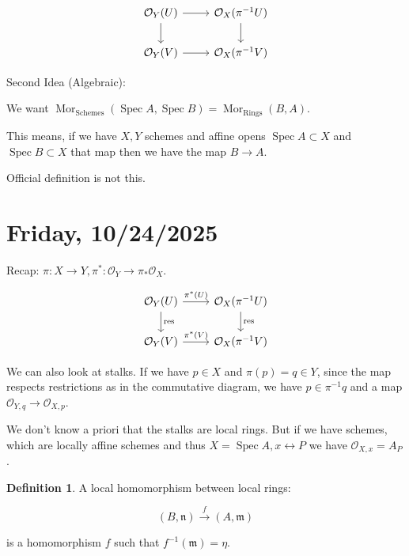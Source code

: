 \documentclass{article}
\theoremstyle{definition}
\newtheorem*{definition}{Definition}
\begin{document}
    \[
        \begin{tikzcd}
            \mathcal{O}_Y(U) \ar[d] \ar[r] & \mathcal{O}_X(\pi ^{-1} U) \ar[d] \\ \mathcal{O}_Y(V) \ar[r] & \mathcal{O}_X(\pi ^{-1} V)
        \end{tikzcd}
    \]

    Second Idea (Algebraic):

    We want \(\operatorname{Mor}_{\text{Schemes}} (\operatorname{Spec} A, \operatorname{Spec} B) = \operatorname{Mor} _{\text{Rings}}(B,A)\).

    This means, if we have \(X, Y\) schemes and affine opens \(\operatorname{Spec} A \subset X\) and \(\operatorname{Spec} B \subset X\) that map then we have the map \(B \to A\).

    Official definition is not this.

    \section*{Friday, 10/24/2025}
    
    Recap: \(\pi: X \to Y, \pi ^{\ast} : \mathcal{O}_Y \to \pi _{\ast} \mathcal{O} _X\).

    \[
        \begin{tikzcd}
            \mathcal{O}_Y(U) \ar[r,"\pi ^{\ast} (U)"] \ar[d,"\text{res}"] & \mathcal{O} _X(\pi ^{-1} U) \ar[d, "\text{res}"] \\ \mathcal{O} _Y(V) \ar[r,"\pi ^{\ast} (V)"] & \mathcal{O}_X(\pi ^{-1} V)
        \end{tikzcd}
    \]

    We can also look at stalks. If we have \(p\in X\) and \(\pi (p) = q \in Y\), since the map respects restrictions as in the commutative diagram, we have \(p\in \pi ^{-1} q\) and a map \(\mathcal{O}_{Y,q} \to \mathcal{O}_{X,p}\).

    We don't know a priori that the stalks are local rings. But if we have schemes, which are locally affine schemes and thus \(X = \operatorname{Spec} A, x \leftrightarrow P\) we have \(\mathcal{O}_{X,x} = A_P\).

    \begin{definition}
        A local homomorphism between local rings:

        \[
            (B, \mathfrak{n}) \xrightarrow{f} (A,\mathfrak{m})
        \]

        is a homomorphism \(f\) such that \(f ^{-1} (\mathfrak{m}) = \eta\). 
    \end{definition}
\end{document}
